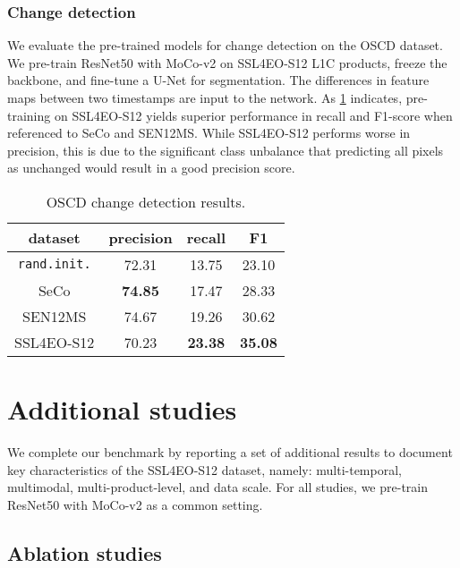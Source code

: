 \documentclass[lettersize,journal]{IEEEtran}
\begin{document}
\subsubsection{Change detection} We evaluate the pre-trained models for change detection on the OSCD \citep{daudt2018urban} dataset. We pre-train ResNet50 with MoCo-v2 on SSL4EO-S12 L1C products, freeze the backbone, and fine-tune a U-Net \citep{ronneberger2015u} for segmentation. The differences in feature maps between two timestamps are input to the network. As \cref{tab:oscd} indicates, pre-training on SSL4EO-S12 yields superior performance in recall and F1-score when referenced to SeCo and SEN12MS. While SSL4EO-S12 performs worse in precision, this is due to the significant class unbalance that predicting all pixels as unchanged would result in a good precision score.
\vspace{-0.5em}
\begin{table}[t]
\centering
\caption{OSCD change detection results.}
\label{tab:oscd}
\begin{tabular}{cccc}
\hline
dataset             & precision & recall & F1    \\ \hline \hline
\texttt{rand.init.}       & 72.31     & 13.75  & 23.10 \\
SeCo  & \textbf{74.85} & 17.47   & 28.33 \\
SEN12MS   & 74.67  & 19.26  & 30.62 \\
SSL4EO-S12     & 70.23     & \textbf{23.38}  & \textbf{35.08} \\
\hline
\end{tabular}
\vspace{-1em}
\end{table}

\section{Additional studies}
\label{sec:add-study}


We complete our benchmark by reporting a set of additional results to document key characteristics of the SSL4EO-S12 dataset, namely: multi-temporal, multimodal, multi-product-level, and data scale. For all studies, we pre-train ResNet50 with MoCo-v2 as a common setting.
\vspace{-0.5em}
\subsection{Ablation studies}
\end{document}
